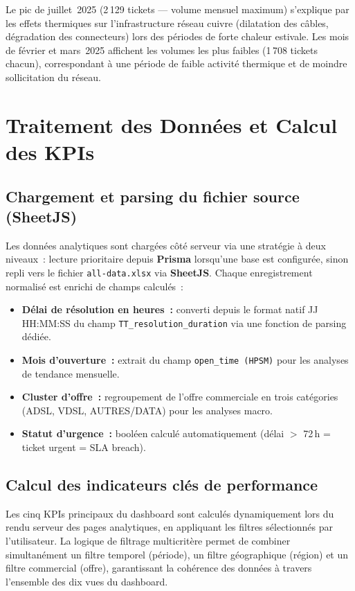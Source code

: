 \documentclass[10pt,a4paper]{report}
\begin{document}
Le pic de juillet~2025 (2\,129 tickets --- volume mensuel maximum) s'explique par les effets thermiques sur l'infrastructure réseau cuivre (dilatation des câbles, dégradation des connecteurs) lors des périodes de forte chaleur estivale. Les mois de février et mars~2025 affichent les volumes les plus faibles (1\,708 tickets chacun), correspondant à une période de faible activité thermique et de moindre sollicitation du réseau.

\section{Traitement des Données et Calcul des KPIs}

\subsection{Chargement et parsing du fichier source (SheetJS)}

Les données analytiques sont chargées côté serveur via une stratégie à deux niveaux~: lecture prioritaire depuis \textbf{Prisma} lorsqu'une base est configurée, sinon repli vers le fichier \texttt{all-data.xlsx} via \textbf{SheetJS}. Chaque enregistrement normalisé est enrichi de champs calculés~:

\begin{itemize}[leftmargin=*, itemsep=4pt]
  \item \textbf{Délai de résolution en heures~:} converti depuis le format natif JJ\,HH:MM:SS du champ \texttt{TT\_resolution\_duration} via une fonction de parsing dédiée.
  \item \textbf{Mois d'ouverture~:} extrait du champ \texttt{open\_time (HPSM)} pour les analyses de tendance mensuelle.
  \item \textbf{Cluster d'offre~:} regroupement de l'offre commerciale en trois catégories (ADSL, VDSL, AUTRES/DATA) pour les analyses macro.
  \item \textbf{Statut d'urgence~:} booléen calculé automatiquement (délai $>$ 72\,h = ticket urgent = SLA breach).
\end{itemize}

\subsection{Calcul des indicateurs clés de performance}

Les cinq KPIs principaux du dashboard sont calculés dynamiquement lors du rendu serveur des pages analytiques, en appliquant les filtres sélectionnés par l'utilisateur. La logique de filtrage multicritère permet de combiner simultanément un filtre temporel (période), un filtre géographique (région) et un filtre commercial (offre), garantissant la cohérence des données à travers l'ensemble des dix vues du dashboard.
\end{document}
